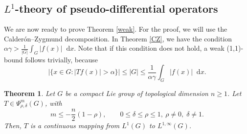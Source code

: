 \documentclass[12pt, reqno]{amsart}
\newtheorem{theorem}{Theorem}[section]
\theoremstyle{definition}
\theoremstyle{remark}
\numberwithin{equation}{section}
\newcommand*\diff{\mathop{}\!\mathrm{d}}
\begin{document}
\subsection{$L^1$-theory of pseudo-differential operators}
We are now ready to prove Theorem \ref{weak}. For the proof, we will use the Calderón–Zygmund decomposition. In Theorem \ref{CZ}, we have the condition $\alpha\gamma>\frac{1}{|G|}\int_{G}|f(x)|\diff{x}$. Note that if this condition does not hold, a weak (1,1)-bound follows trivially, because
\begin{equation*}
    |\{x\in G:|Tf(x)|>\alpha\}|\leq|G|\leq\frac{1}{\alpha\gamma}\int_{G}|f(x)|\diff{x}.
\end{equation*}
\begingroup
\renewcommand{\thetheorem}{1.2}
\begin{theorem}
    Let $G$ be a compact Lie group of topological dimension $n\geq 1$. Let $T\in\Psi^{m}_{\rho,\delta}(G)$, with
    \[
m \le -\frac{n}{2}(1-\rho),
\qquad 0 \le \delta \le \rho \le 1,\ \rho\neq0,\;\delta \neq 1.
\]  
    Then, $T$ is a continuous mapping from $L^1(G)$ to $L^{1,\infty}(G)$.
\end{theorem}
\endgroup
\addtocounter{theorem}{-1}
\end{document}
